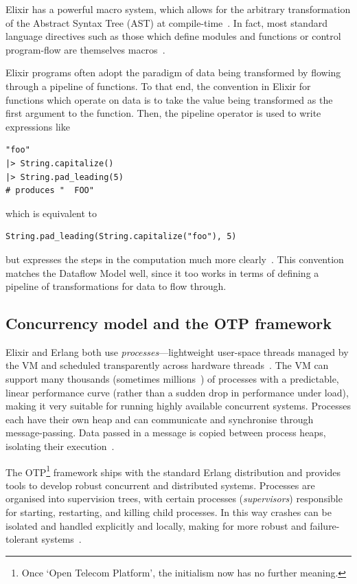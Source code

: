 Elixir has a powerful macro system, which allows for the arbitrary transformation of the Abstract Syntax Tree (AST) at compile-time~\cite[p.~13]{Elixir-Metaprogramming}.
In fact, most standard language directives such as those which define modules and functions or control program-flow are themselves macros~\cite[p.~21]{Elixir-Metaprogramming}.

Elixir programs often adopt the paradigm of data being transformed by flowing through a pipeline of functions.
To that end, the convention in Elixir for functions which operate on data is to take the value being transformed as the first argument to the function.
Then, the pipeline operator \exs{|>} is used to write expressions like
\begin{verbatim}
"foo"
|> String.capitalize()
|> String.pad_leading(5)
# produces "  FOO"
\end{verbatim}
which is equivalent to
\begin{verbatim}
String.pad_leading(String.capitalize("foo"), 5)		
\end{verbatim}
but expresses the steps in the computation much more clearly~\cite[p.~56]{Thomas:2016}.
This convention matches the Dataflow Model well, since it too works in terms of defining a pipeline of transformations for data to flow through.

\subsection{Concurrency model and the OTP framework}\label{sec:prep:elixir:otp}

Elixir and Erlang both use \emph{processes}---lightweight user-space threads managed by the VM and scheduled transparently across hardware threads~\cite[p.~185]{Thomas:2016}.
The VM can support many thousands (sometimes millions~\cite{elixir-2million-processes}) of processes with a predictable, linear performance curve (rather than a sudden drop in performance under load), making it very suitable for running highly available concurrent systems.
Processes each have their own heap and can communicate and synchronise through message-passing.
Data passed in a message is copied between process heaps, isolating their execution~\cite[p.~29]{scalability_erlang_otp}.

The OTP\footnote{
Once `Open Telecom Platform', the initialism now has no further meaning.
} framework ships with the standard Erlang distribution and provides tools to develop robust concurrent and distributed systems.
Processes are organised into supervision trees, with certain processes (\emph{supervisors}) responsible for starting, restarting, and killing child processes.
In this way crashes can be isolated and handled explicitly and locally, making for more robust and failure-tolerant systems~\cite[p.~169]{scalability_erlang_otp}.

